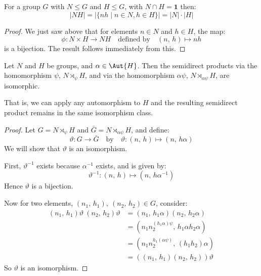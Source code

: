 \begin{lemma}\label{lem:setprodorder}
    For a group \(G\) with \(N \leqslant G\) and \(H \leqslant G\), with \(N \cap H = \bm{1}\) then:
    \[|NH| = |\{nh \mid n \in N, h \in H\}| = |N| \cdot |H|\]
\end{lemma}

\begin{proof}
    We just saw above that for elements \(n \in N\) and \(h \in H\), the map:
    \[\phi:N \times H \to NH \quad \text{defined by} \quad (n,\,h) \mapsto nh\]
    is a bijection.
    The result follows immediately from this.
\end{proof}

\begin{lemma}\label{lem:semiisom}
    Let \(N\) and \(H\) be groups, and \(\alpha \in \Aut{H}\).
    Then the semidirect products via the homomorphism \(\psi\), \(N \rtimes_\psi H\), and via the homomorphism
    \(\alpha\psi\), \(N \rtimes_{\alpha\psi} H\), are isomorphic.

    That is, we can apply any automorphism to \(H\) and the resulting semidirect product remains in the same isomorphism
    class.
\end{lemma}

\begin{proof}
    Let \(G = N \rtimes_\psi H\) and \(\bar{G} = N \rtimes_{\alpha\psi} H\), and define:
    \[\vartheta:G \to \bar{G} \quad \text{by} \quad \vartheta:(n,\,h) \mapsto (n,\,h\alpha)\]
    We will show that \(\vartheta\) is an isomorphism.

    First, \(\vartheta^{-1}\) exists because \(\alpha^{-1}\) exists, and is given by:
    \[\vartheta^{-1}:(n,\,h) \mapsto (n,\,h\alpha^{-1})\]
    Hence \(\vartheta\) is a bijection.

    Now for two elements, \((n_1,\,h_1),\ (n_2,\,h_2) \in G\), consider:
    \begin{equation*}
    \begin{aligned}
        (n_1,\,h_1)\vartheta\ (n_2,\,h_2)\vartheta &= (n_1,\,h_1\alpha)(n_2,\,h_2\alpha) \\
        &= (n_1 n_2^{(h_1\alpha)\psi},\,h_1\alpha h_2\alpha) \\
        &= (n_1 n_2^{h_1(\alpha\psi)},\, (h_1 h_2)\alpha) \\
        &= ((n_1,\,h_1)(n_2,\,h_2))\vartheta
    \end{aligned}
    \end{equation*}
    So \(\vartheta\) is an isomorphism.
\end{proof}

